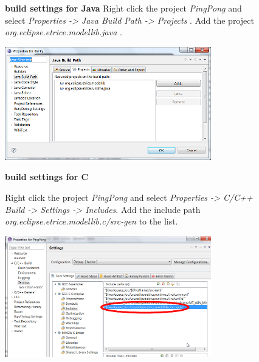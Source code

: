 \begin{figure}[ht]
\begin{minipage}[t]{0.50\linewidth}
\begin{mdframed}
	\textbf{build settings for Java}
	\newline
Right click the project \textit{PingPong} and select \emph{Properties -> Java Build Path -> Projects} . Add the project \emph{org.eclipse.etrice.modellib.java} .
  
\includegraphics[width=0.8\textwidth]{images/020-Blinky16.png}

\end{mdframed}
\end{minipage}
\hspace{0.1cm}
\begin{minipage}[t]{0.50\linewidth}
\begin{mdframed}
	\textbf{build settings for C}
	\newline

Right click the project \textit{PingPong} and select \emph{Properties -> C/C++ Build -> Settings -> Includes}. Add the include path \emph{org.eclipse.etrice.modellib.c/src-gen} to the list.

\includegraphics[width=0.8\textwidth]{images/017-06-Settings-for-C-Includes.png}


\end{mdframed}
\end{minipage}
\end{figure}

